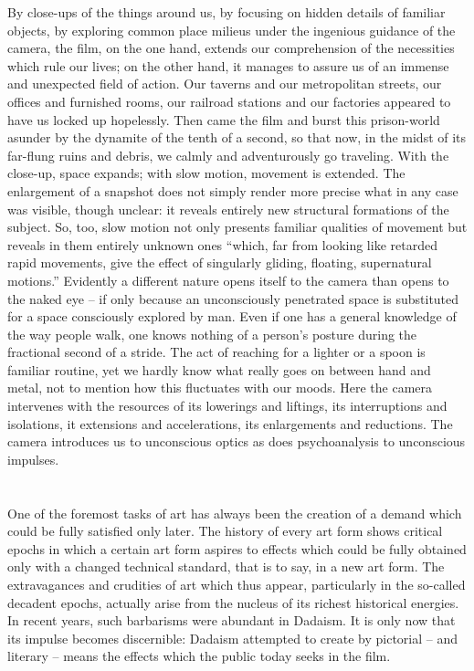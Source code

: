 \documentclass[11pt, letterpaper]{article}
\begin{document}
By close-ups of the things around us, by focusing on hidden details of familiar
objects, by exploring common place milieus under the ingenious guidance of the
camera, the film, on the one hand, extends our comprehension of the necessities
which rule our lives; on the other hand, it manages to assure us of an immense
and unexpected field of action. Our taverns and our metropolitan streets, our
offices and furnished rooms, our railroad stations and our factories appeared
to have us locked up hopelessly. Then came the film and burst this prison-world
asunder by the dynamite of the tenth of a second, so that now, in the midst of
its far-flung ruins and debris, we calmly and adventurously go traveling. With
the close-up, space expands; with slow motion, movement is extended. The
enlargement of a snapshot does not simply render more precise what in any case
was visible, though unclear: it reveals entirely new structural formations of
the subject. So, too, slow motion not only presents familiar qualities of
movement but reveals in them entirely unknown ones “which, far from looking
like retarded rapid movements, give the effect of singularly gliding, floating,
supernatural motions.” Evidently a different nature opens itself to the camera
than opens to the naked eye – if only because an unconsciously penetrated space
is substituted for a space consciously explored by man. Even if one has a
general knowledge of the way people walk, one knows nothing of a person’s
posture during the fractional second of a stride. The act of reaching for a
lighter or a spoon is familiar routine, yet we hardly know what really goes on
between hand and metal, not to mention how this fluctuates with our moods. Here
the camera intervenes with the resources of its lowerings and liftings, its
interruptions and isolations, it extensions and accelerations, its enlargements
and reductions. The camera introduces us to unconscious optics as does
psychoanalysis to unconscious impulses.

\section{}

One of the foremost tasks of art has always been the creation of a demand which
could be fully satisfied only later. The history of every art form shows
critical epochs in which a certain art form aspires to effects which could be
fully obtained only with a changed technical standard, that is to say, in a new
art form. The extravagances and crudities of art which thus appear,
particularly in the so-called decadent epochs, actually arise from the nucleus
of its richest historical energies. In recent years, such barbarisms were
abundant in Dadaism. It is only now that its impulse becomes discernible:
Dadaism attempted to create by pictorial – and literary – means the effects
which the public today seeks in the film.
\end{document}
